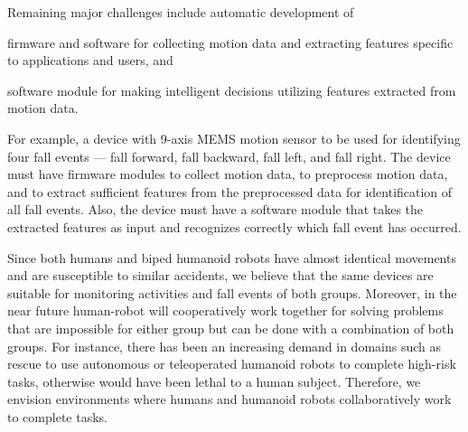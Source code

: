 \documentclass{IEEEtran}
\begin{document}
\par
Remaining major challenges include automatic development of \begin{inparaenum}[($i$)] \item firmware and software for collecting motion data and  extracting features specific to applications and users, and \item software module for making intelligent decisions utilizing features extracted from motion data. \end{inparaenum}
For example, a device with 9-axis MEMS motion sensor to be used for identifying four fall events --- fall forward, fall backward, fall left, and fall right. The device must have firmware modules to collect motion data, to preprocess motion data, and to extract sufficient features from the preprocessed data for identification of all fall events. Also, the device must have a software module that takes the extracted features as input and recognizes correctly  which fall event has occurred.


\par
Since both humans and biped humanoid robots have almost identical movements and are susceptible to 
similar accidents, we believe that the same devices are suitable for monitoring activities and fall events of both 
groups. Moreover, in the near future human-robot will cooperatively work together for solving problems that are impossible for either group but can be done with a combination of both groups.  For instance, there has been an increasing demand in 
domains such as rescue to use autonomous or teleoperated humanoid robots to complete high-risk 
tasks, otherwise would have been lethal to a human subject. Therefore, we envision environments 
where humans and humanoid robots collaboratively work to complete tasks. 
\end{document}

